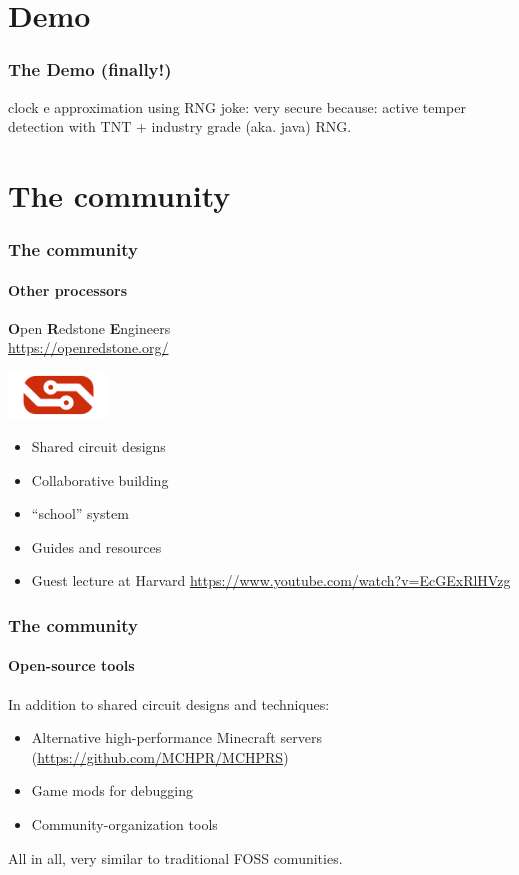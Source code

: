 \documentclass[aspectratio=169]{beamer}
\begin{document}
\section{Demo}

\begin{frame}
	\frametitle{The Demo (finally!)}
	clock
	e approximation using RNG
	joke: very secure because: active temper detection with TNT + industry grade (aka. java) RNG.
\end{frame}

\section{The community}

\begin{frame}
	\frametitle{The community}
	\framesubtitle{Other processors}

	\textbf{O}pen \textbf{R}edstone \textbf{E}ngineers
	\\
	\url{https://openredstone.org/}

	\includegraphics[width=0.2\textwidth]{imgs/ore.png}

	\begin{itemize}

		\item Shared circuit designs
		\item Collaborative building
		\item ``school'' system
		\item Guides and resources
		\item<2-> Guest lecture at Harvard \url{https://www.youtube.com/watch?v=EcGExRlHVzg}
	\end{itemize}
\end{frame}

\begin{frame}
	\frametitle{The community}
	\framesubtitle{Open-source tools}

	In addition to shared circuit designs and techniques:

	\begin{itemize}
		\item Alternative high-performance Minecraft servers (\url{https://github.com/MCHPR/MCHPRS})
		\item Game mods for debugging
		\item Community-organization tools
	\end{itemize}

	\pause

	All in all, very similar to traditional FOSS comunities.

\end{frame}
\end{document}
